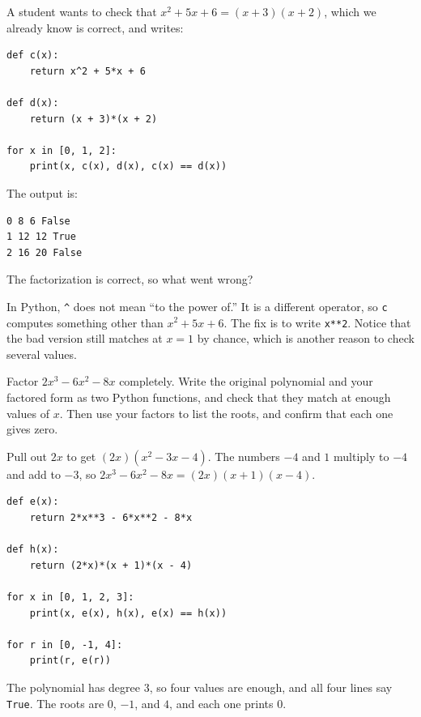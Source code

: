 \begin{Exercise}[title={Spot the bug}, label={ex:factoring_polynomials-python-3}]
A student wants to check that $x^2 + 5x + 6 = (x + 3)(x + 2)$, which we
already know is correct, and writes:
\begin{verbatim}
def c(x):
    return x^2 + 5*x + 6

def d(x):
    return (x + 3)*(x + 2)

for x in [0, 1, 2]:
    print(x, c(x), d(x), c(x) == d(x))
\end{verbatim}
The output is:
\begin{verbatim}
0 8 6 False
1 12 12 True
2 16 20 False
\end{verbatim}
The factorization is correct, so what went wrong?
\end{Exercise}
\begin{Answer}[ref={ex:factoring_polynomials-python-3}]
In Python, \texttt{^} does not mean ``to the power of.'' It is
a different operator, so \texttt{c} computes something
other than $x^2 + 5x + 6$. The fix is to write
\texttt{x**2}. Notice that the bad version still matches at
$x = 1$ by chance, which is another reason to check several values.
\end{Answer}

\begin{Exercise}[title={Factor, check, and find the roots}, label={ex:factoring_polynomials-python-4}]
Factor $2x^3 - 6x^2 - 8x$ completely. Write the original polynomial and
your factored form as two Python functions, and check that they match
at enough values of $x$. Then use your factors to list the roots, and
confirm that each one gives zero.
\end{Exercise}
\begin{Answer}[ref={ex:factoring_polynomials-python-4}]
Pull out $2x$ to get $(2x)(x^2 - 3x - 4)$. The numbers $-4$ and $1$
multiply to $-4$ and add to $-3$, so
$2x^3 - 6x^2 - 8x = (2x)(x + 1)(x - 4)$.
\begin{verbatim}
def e(x):
    return 2*x**3 - 6*x**2 - 8*x

def h(x):
    return (2*x)*(x + 1)*(x - 4)

for x in [0, 1, 2, 3]:
    print(x, e(x), h(x), e(x) == h(x))

for r in [0, -1, 4]:
    print(r, e(r))
\end{verbatim}
The polynomial has degree 3, so four values are enough, and all four
lines say \texttt{True}. The roots are $0$, $-1$, and $4$,
and each one prints $0$.
\end{Answer}

